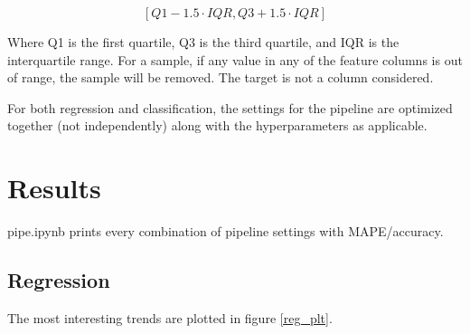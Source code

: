 \documentclass[12pt, letterpaper]{article}
\begin{document}
$$
[Q1 - 1.5 \cdot IQR, Q3 + 1.5 \cdot IQR]
$$

Where Q1 is the first quartile, Q3 is the third quartile, and IQR is the interquartile range. For a sample, if any value in any of the feature columns is out of range, the sample will be removed. The target is not a column considered.

For both regression and classification, the settings for the pipeline are optimized together (not independently) along with the hyperparameters as applicable.

\section{Results} %

pipe.ipynb prints every combination of pipeline settings with MAPE/accuracy.

\subsection{Regression}\label{reg_results}

The most interesting trends are plotted in figure \ref{reg_plt}.
\end{document}
